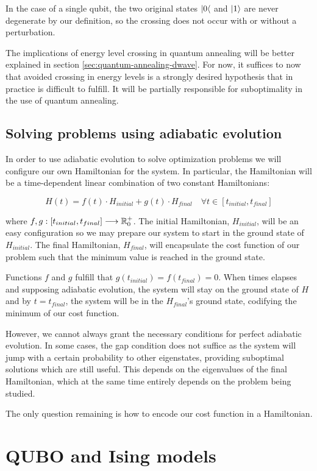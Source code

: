 In the case of a single qubit, the two original states $|0\langle$ and $|1\rangle$ are never degenerate by our definition, so the crossing does not occur with or without a perturbation.

The implications of energy level crossing in quantum annealing will be better explained in section \ref{sec:quantum-annealing-dwave}. For now, it suffices to now that avoided crossing in energy levels is a strongly desired hypothesis that in practice is difficult to fulfill. It will be partially responsible for suboptimality in the use of quantum annealing.


\subsection{Solving problems using adiabatic evolution}


In order to use adiabatic evolution to solve optimization problems we will configure our own Hamiltonian for the system. In particular, the Hamiltonian will be a time-dependent linear combination of two constant Hamiltonians:

$$ H(t) = f(t) \cdot H_{initial} + g(t) \cdot H_{final} \quad \forall t \in [t_{initial}, t_{final}] $$

where $f,g: [t_{initial}, t_{final}] \longrightarrow \mathbb{R}^+_0$. The initial Hamiltonian, $H_{initial}$, will be an easy configuration so we may prepare our system to start in the ground state of $H_{initial}$. The final Hamiltonian, $H_{final}$, will encapsulate the cost function of our problem such that the minimum value is reached in the ground state. 

Functions $f$ and $g$ fulfill that $g(t_{initial}) = f(t_{final}) = 0$. When times elapses and supposing adiabatic evolution, the system will stay on the ground state of $H$ and by $t = t_{final}$, the system will be in the $H_{final}$'s ground state, codifying the minimum of our cost function.

However, we cannot always grant the necessary conditions for perfect adiabatic evolution. In some cases, the gap condition does not suffice as the system will jump with a certain probability to other eigenstates, providing suboptimal solutions which are still useful. This depends on the eigenvalues of the final Hamiltonian, which at the same time entirely depends on the problem being studied.

The only question remaining is how to encode our cost function in a Hamiltonian.


\section{QUBO and Ising models}
\label{sec:qubo}


